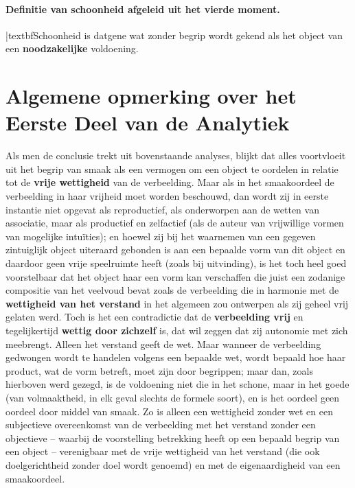 \paragraph{Definitie van schoonheid afgeleid uit het vierde moment.} |textbf{Schoonheid} is datgene wat zonder begrip wordt gekend als het object van een \textbf{noodzakelijke} voldoening.

\section*{Algemene opmerking over het Eerste Deel van de Analytiek}

Als men de conclusie trekt uit bovenstaande analyses, blijkt dat alles voortvloeit uit het begrip van smaak als een vermogen om een object te oordelen in relatie tot de \textbf{vrije wettigheid} van de verbeelding. Maar als in het smaakoordeel de verbeelding in haar vrijheid moet worden beschouwd, dan wordt zij in eerste instantie niet opgevat als reproductief, als onderworpen aan de wetten van associatie, maar als productief en zelfactief (als de auteur van vrijwillige vormen van mogelijke intuïties); en hoewel zij bij het waarnemen van een gegeven zintuiglijk object uiteraard gebonden is aan een bepaalde vorm van dit object en daardoor geen vrije speelruimte heeft (zoals bij uitvinding), is het toch heel goed voorstelbaar dat het object haar een vorm kan verschaffen die juist een zodanige compositie van het veelvoud bevat zoals de verbeelding die in harmonie met de \textbf{wettigheid van het verstand} in het algemeen zou ontwerpen als zij geheel vrij gelaten werd. Toch is het een contradictie dat de \textbf{verbeelding vrij} en tegelijkertijd \textbf{wettig door zichzelf} is, dat wil zeggen dat zij autonomie met zich meebrengt. Alleen het verstand geeft de wet. Maar wanneer de verbeelding gedwongen wordt te handelen volgens een bepaalde wet, wordt bepaald hoe haar product, wat de vorm betreft, moet zijn door begrippen; maar dan, zoals hierboven werd gezegd, is de voldoening niet die in het schone, maar in het goede (van volmaaktheid, in elk geval slechts de formele soort), en is het oordeel geen oordeel door middel van smaak. Zo is alleen een wettigheid zonder wet en een subjectieve overeenkomst van de verbeelding met het verstand zonder een objectieve – waarbij de voorstelling betrekking heeft op een bepaald begrip van een object – verenigbaar met de vrije wettigheid van het verstand (die ook doelgerichtheid zonder doel wordt genoemd) en met de eigenaardigheid van een smaakoordeel.

